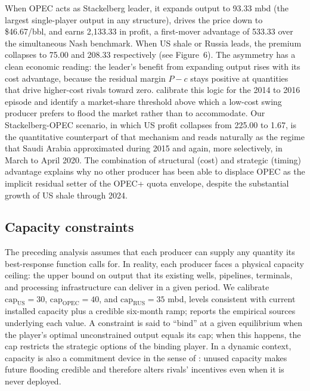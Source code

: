 When OPEC acts as Stackelberg leader, it expands output to 93.33 mbd
(the largest single-player output in any structure), drives the price
down to \$46.67/bbl, and earns 2,133.33 in profit, a first-mover
advantage of 533.33 over the simultaneous Nash benchmark. When US shale
or Russia leads, the premium collapses to 75.00 and 208.33 respectively
(see Figure~6). The asymmetry has a clean economic reading: the leader's
benefit from expanding output rises with its cost advantage, because the
residual margin $P - c$ stays positive at quantities that drive
higher-cost rivals toward zero. \citet{beharritz2017} calibrate this
logic for the 2014 to 2016 episode and identify a market-share threshold
above which a low-cost swing producer prefers to flood the market rather
than to accommodate. Our Stackelberg-OPEC scenario, in which US profit
collapses from 225.00 to 1.67, is the quantitative counterpart of that
mechanism and reads naturally as the regime that Saudi Arabia
approximated during 2015 and again, more selectively, in March to April
2020. The combination of structural (cost) and strategic (timing)
advantage explains why no other producer has been able to displace OPEC
as the implicit residual setter of the OPEC+ quota envelope, despite
the substantial growth of US shale through 2024.

\subsection{Capacity constraints}
\label{subsec:capacity}

The preceding analysis assumes that each producer can supply any
quantity its best-response function calls for. In reality, each producer
faces a physical capacity ceiling: the upper bound on output that its
existing wells, pipelines, terminals, and processing infrastructure can
deliver in a given period. We calibrate $\mathrm{cap}_{\text{US}} = 30$,
$\mathrm{cap}_{\text{OPEC}} = 40$, and $\mathrm{cap}_{\text{RUS}} = 35$
mbd, levels consistent with current installed capacity plus a credible
six-month ramp;  reports the empirical sources underlying
each value. A constraint is said to ``bind'' at a given equilibrium when
the player's optimal unconstrained output equals its cap; when this
happens, the cap restricts the strategic options of the binding player.
In a dynamic context, capacity is also a commitment device in the sense
of \citet{dixit1980}: unused capacity makes future flooding credible and
therefore alters rivals' incentives even when it is never deployed.

